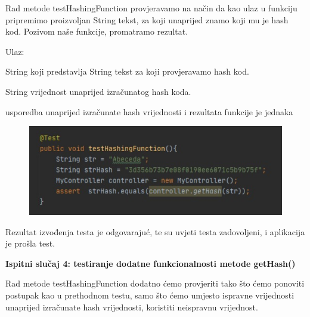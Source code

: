 		Rad metode testHashingFunction provjeravamo na način da kao ulaz u funkciju pripremimo proizvoljan String tekst, za koji unaprijed znamo koji mu je hash kod. Pozivom naše funkcije, promatramo rezultat.
		\vspace{3mm} %

		Ulaz:
		\noindent
		\begin{packed_enum}
		    \item String koji predstavlja String tekst za koji provjeravamo hash kod.
		    \item String vrijednost unaprijed izračunatog hash koda.
		\end{packed_enum}
		
		\noindent
		\begin{packed_enum}
		    \item usporedba unaprijed izračunate hash vrijednosti i rezultata funkcije je jednaka

		\end{packed_enum}
		
		\begin{figure}[H]
            \includegraphics[scale=1]{dokumentacija/slike/testHash1.PNG} %
            \centering
            \label{fig:promjene}
            \end{figure}
			
		Rezultat izvođenja testa je odgovarajuć, te su uvjeti testa zadovoljeni, i aplikacija je prošla test.
		
		\vspace{10mm} %
		
		\textbf{Ispitni slučaj 4: testiranje dodatne funkcionalnosti metode getHash() }
			
		Rad metode testHashingFunction dodatno ćemo provjeriti tako što ćemo ponoviti postupak kao u prethodnom testu, samo što ćemo umjesto ispravne vrijednosti unaprijed izračunate hash vrijednosti, koristiti neispravnu vrijednost.
		\vspace{3mm} %
		
